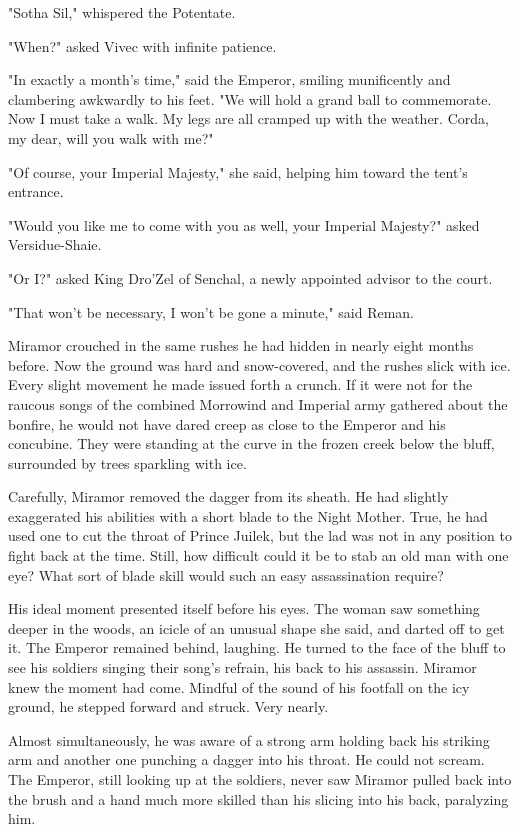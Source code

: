 "Sotha Sil," whispered the Potentate.

"When?" asked Vivec with infinite patience.

"In exactly a month's time," said the Emperor, smiling munificently and clambering awkwardly to his feet. "We will hold a grand ball to commemorate. Now I must take a walk. My legs are all cramped up with the weather. Corda, my dear, will you walk with me?"

"Of course, your Imperial Majesty," she said, helping him toward the tent's entrance.

"Would you like me to come with you as well, your Imperial Majesty?" asked Versidue-Shaie.

"Or I?" asked King Dro'Zel of Senchal, a newly appointed advisor to the court.

"That won't be necessary, I won't be gone a minute," said Reman.

Miramor crouched in the same rushes he had hidden in nearly eight months before. Now the ground was hard and snow-covered, and the rushes slick with ice. Every slight movement he made issued forth a crunch. If it were not for the raucous songs of the combined Morrowind and Imperial army gathered about the bonfire, he would not have dared creep as close to the Emperor and his concubine. They were standing at the curve in the frozen creek below the bluff, surrounded by trees sparkling with ice.

Carefully, Miramor removed the dagger from its sheath. He had slightly exaggerated his abilities with a short blade to the Night Mother. True, he had used one to cut the throat of Prince Juilek, but the lad was not in any position to fight back at the time. Still, how difficult could it be to stab an old man with one eye? What sort of blade skill would such an easy assassination require?

His ideal moment presented itself before his eyes. The woman saw something deeper in the woods, an icicle of an unusual shape she said, and darted off to get it. The Emperor remained behind, laughing. He turned to the face of the bluff to see his soldiers singing their song's refrain, his back to his assassin. Miramor knew the moment had come. Mindful of the sound of his footfall on the icy ground, he stepped forward and struck. Very nearly.

Almost simultaneously, he was aware of a strong arm holding back his striking arm and another one punching a dagger into his throat. He could not scream. The Emperor, still looking up at the soldiers, never saw Miramor pulled back into the brush and a hand much more skilled than his slicing into his back, paralyzing him.

